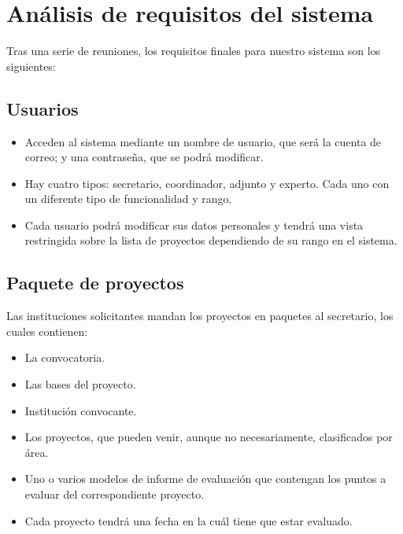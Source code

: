 \documentclass[12pt,a4paper,spanish,twoside]{book}
\begin{document}
\section{Análisis de requisitos del sistema}
Tras una serie de reuniones, los requisitos finales para nuestro sistema son
los siguientes: 

\subsection{Usuarios}
\begin{itemize}
\item Acceden al sistema mediante un nombre de usuario, que será la cuenta de
  correo; y una contraseña, que se podrá modificar.
\item Hay cuatro tipos: secretario, coordinador, adjunto y experto. Cada uno
  con un diferente tipo de funcionalidad y rango. 
\item Cada usuario podrá modificar sus datos personales y tendrá una vista
  restringida sobre la lista de proyectos dependiendo de su rango en el 
  sistema.
\end{itemize}

\subsection{Paquete de proyectos}
Las instituciones solicitantes mandan los proyectos en paquetes al
secretario, los cuales contienen: 
\begin{itemize}
\item La convocatoria.
\item Las bases del proyecto.
\item Institución convocante.
\item Los proyectos, que pueden venir, aunque no necesariamente, clasificados
  por área. 
\item Uno o varios modelos de informe de evaluación que contengan los puntos
  a evaluar del correspondiente proyecto. 
\item Cada proyecto tendrá una fecha en la cuál tiene que estar evaluado.
\end{itemize}
\end{document}
